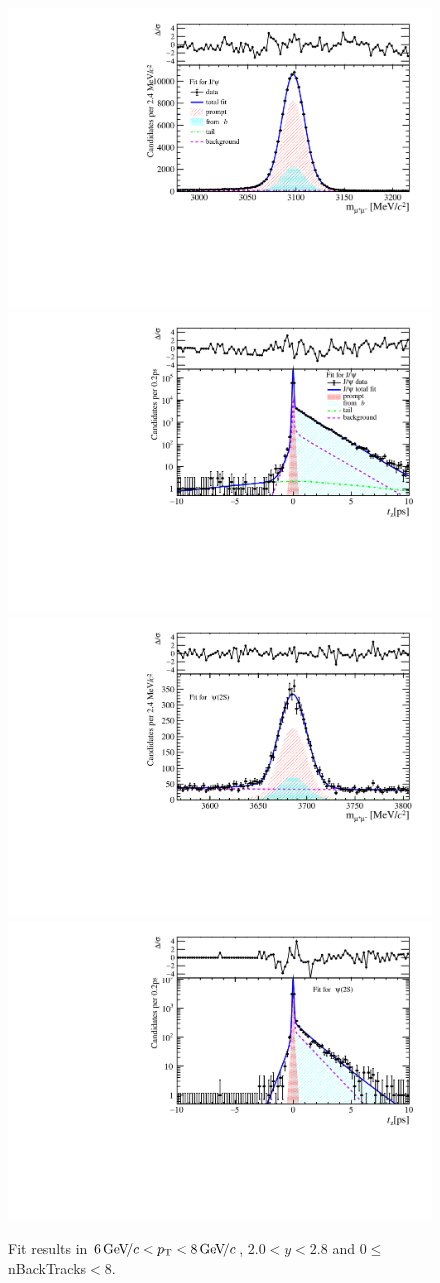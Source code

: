 \begin{figure}[H]
\begin{center}
\includegraphics[width=0.47\linewidth]{pdf/Jpsi/drawmassB/n1y1pt4.pdf}
\includegraphics[width=0.47\linewidth]{pdf/Jpsi/2DFitB/n1y1pt4.pdf}
\vspace*{-0.5cm}
\includegraphics[width=0.47\linewidth]{pdf/Psi2S/drawmassB/n1y1pt4.pdf}
\includegraphics[width=0.47\linewidth]{pdf/Psi2S/2DFitB/n1y1pt4.pdf}
\vspace*{-0.5cm}
\end{center}
\caption{Fit results in $6\text{\,Ge\kern -0.1em V\!/}c<p_{\mathrm{T}}<8\text{\,Ge\kern -0.1em V\!/}c$, $2.0<y<2.8$ and 0$\leq$nBackTracks$<$8.}
\label{Fitn1y1pt4}
\end{figure}
